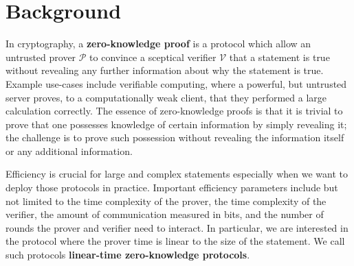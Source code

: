 \chapter{Background}


In cryptography, a \textbf{zero-knowledge proof} is a protocol which allow an untrusted prover $\mathcal{P}$ to convince a sceptical verifier $\mathcal{V}$ that a statement is true without revealing any further information about why the statement is true. 
Example use-cases include verifiable computing, where a powerful, but untrusted server proves, to a computationally weak client, that they performed a large calculation correctly. 
The essence of zero-knowledge proofs is that it is trivial to prove that one possesses knowledge of certain information by simply revealing it; the challenge is to prove such possession without revealing the information itself or any additional information.


Efficiency is crucial for large and complex statements especially when we want to deploy those protocols in practice. Important efficiency parameters include but not limited to the time complexity of the prover, the time complexity of the verifier, the amount of communication measured in bits, and the number of rounds the prover and verifier need to interact. In particular, we are interested in the protocol where the prover time is linear to the size of the statement. We call such protocols \textbf{linear-time zero-knowledge protocols}.

